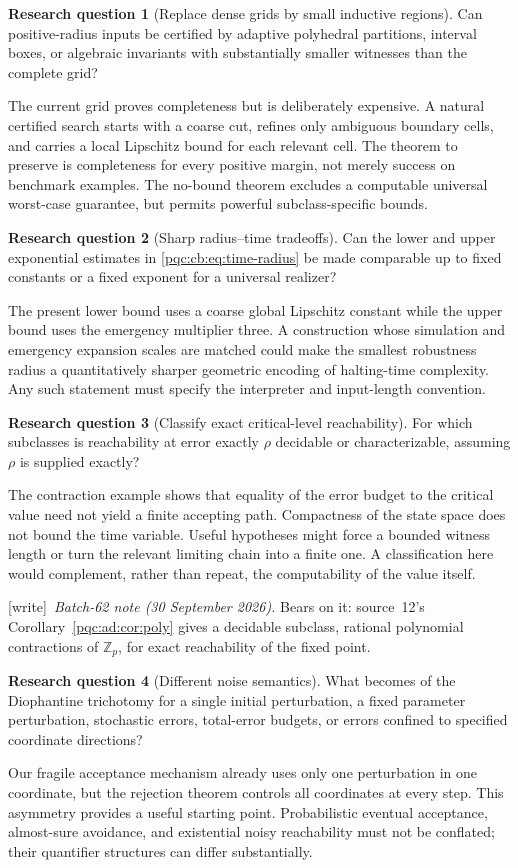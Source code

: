 \documentclass[11pt,letterpaper]{article}
\numberwithin{equation}{section}
\theoremstyle{definition}
\newtheorem{question}{Research question}
\theoremstyle{remark}
\newcommand{\Z}{\mathbb Z}
\newcommand{\wtag}{\textup{[write]}}
\begin{document}
\begin{question}[Replace dense grids by small inductive regions]
Can positive-radius inputs be certified by adaptive polyhedral partitions,
interval boxes, or algebraic invariants with substantially smaller witnesses
than the complete grid?
\end{question}
The current grid proves completeness but is deliberately expensive.  A
natural certified search starts with a coarse cut, refines only ambiguous
boundary cells, and carries a local Lipschitz bound for each relevant cell.
The theorem to preserve is completeness for every positive margin, not merely
success on benchmark examples.  The no-bound theorem excludes a computable
universal worst-case guarantee, but permits powerful subclass-specific bounds.

\begin{question}[Sharp radius--time tradeoffs]
Can the lower and upper exponential estimates in \eqref{pqc:cb:eq:time-radius} be
made comparable up to fixed constants or a fixed exponent for a universal
realizer?
\end{question}
The present lower bound uses a coarse global Lipschitz constant while the
upper bound uses the emergency multiplier three.  A construction whose
simulation and emergency expansion scales are matched could make the
smallest robustness radius a quantitatively sharper geometric encoding of
halting-time complexity.  Any such statement must specify the interpreter
and input-length convention.

\begin{question}[Classify exact critical-level reachability]\label{pqc:cb:q:critical}
For which subclasses is reachability at error exactly $\rho$ decidable or
characterizable, assuming $\rho$ is supplied exactly?
\end{question}
The contraction example shows that equality of the error budget to the
critical value need not yield a finite accepting path.  Compactness of the
state space does not bound the time variable.  Useful hypotheses might force
a bounded witness length or turn the relevant limiting chain into a finite
one.  A classification here would complement, rather than repeat, the
computability of the value itself.
\par\noindent\wtag\ \emph{Batch-62 note (30 September 2026).} Bears on it: source~12's Corollary~\ref{pqc:ad:cor:poly} gives a decidable
subclass, rational polynomial contractions of $\Z_p$, for exact reachability of
the fixed point.

\begin{question}[Different noise semantics]\label{pqc:cb:q:noise}
What becomes of the Diophantine trichotomy for a single initial perturbation,
a fixed parameter perturbation, stochastic errors, total-error budgets, or
errors confined to specified coordinate directions?
\end{question}
Our fragile acceptance mechanism already uses only one perturbation in one
coordinate, but the rejection theorem controls all coordinates at every step.
This asymmetry provides a useful starting point.  Probabilistic eventual
acceptance, almost-sure avoidance, and existential noisy reachability must not
be conflated; their quantifier structures can differ substantially.
\end{document}
